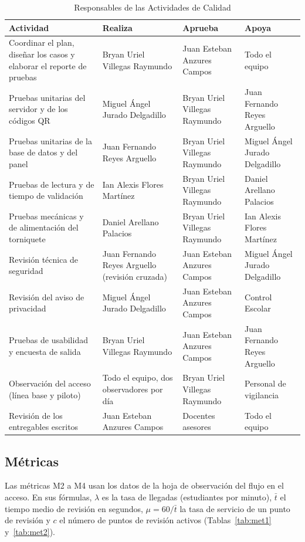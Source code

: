 \begin{table}[tbp]
	\caption{Responsables de las Actividades de Calidad}
	\label{tab:respcalidad}
	\small\setlength{\tabcolsep}{3pt}
	\begin{tabular}{P{5.4cm}P{3.5cm}P{3cm}P{3cm}}
		\toprule
		Actividad & Realiza & Aprueba & Apoya \\
		\midrule
		Coordinar el plan, diseñar los casos y elaborar el reporte de pruebas & Bryan Uriel Villegas Raymundo & Juan Esteban Anzures Campos & Todo el equipo \\
		Pruebas unitarias del servidor y de los códigos QR & Miguel Ángel Jurado Delgadillo & Bryan Uriel Villegas Raymundo & Juan Fernando Reyes Arguello \\
		Pruebas unitarias de la base de datos y del panel & Juan Fernando Reyes Arguello & Bryan Uriel Villegas Raymundo & Miguel Ángel Jurado Delgadillo \\
		Pruebas de lectura y de tiempo de validación & Ian Alexis Flores Martínez & Bryan Uriel Villegas Raymundo & Daniel Arellano Palacios \\
		Pruebas mecánicas y de alimentación del torniquete & Daniel Arellano Palacios & Bryan Uriel Villegas Raymundo & Ian Alexis Flores Martínez \\
		Revisión técnica de seguridad & Juan Fernando Reyes Arguello (revisión cruzada) & Juan Esteban Anzures Campos & Miguel Ángel Jurado Delgadillo \\
		Revisión del aviso de privacidad & Miguel Ángel Jurado Delgadillo & Juan Esteban Anzures Campos & Control Escolar \\
		Pruebas de usabilidad y encuesta de salida & Bryan Uriel Villegas Raymundo & Juan Esteban Anzures Campos & Juan Fernando Reyes Arguello \\
		Observación del acceso (línea base y piloto) & Todo el equipo, dos observadores por día & Bryan Uriel Villegas Raymundo & Personal de vigilancia \\
		Revisión de los entregables escritos & Juan Esteban Anzures Campos & Docentes asesores & Todo el equipo \\
		\bottomrule
	\end{tabular}
\end{table}

\subsection{Métricas}
Las métricas M2 a M4 usan los datos de la hoja de observación del flujo en el
acceso. En sus fórmulas, $\lambda$ es la tasa de llegadas (estudiantes por
minuto), $\bar{t}$ el tiempo medio de revisión en segundos, $\mu = 60/\bar{t}$
la tasa de servicio de un punto de revisión y $c$ el número de puntos de
revisión activos (Tablas~\ref{tab:met1} y~\ref{tab:met2}).

